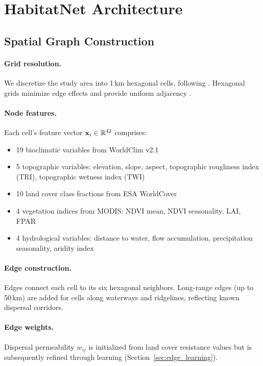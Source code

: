 \section{HabitatNet Architecture}

\label{sec:architecture}

\subsection{Spatial Graph Construction}

\paragraph{Grid resolution.} We discretize the study area into 1\,km
hexagonal cells, following \citet{jetz2019essential}. Hexagonal grids
minimize edge effects and provide uniform adjacency
\citep{birch2007rectangular}.

\paragraph{Node features.} Each cell's feature vector $\mathbf{x}_i \in
\mathbb{R}^{42}$ comprises:
\begin{itemize}
  \item 19 bioclimatic variables from WorldClim v2.1
    \citep{fick2017worldclim}
  \item 5 topographic variables: elevation, slope, aspect,
    topographic roughness index (TRI), topographic wetness index (TWI)
  \item 10 land cover class fractions from ESA WorldCover
    \citep{zanaga2022esa}
  \item 4 vegetation indices from MODIS: NDVI mean, NDVI seasonality,
    LAI, FPAR
  \item 4 hydrological variables: distance to water, flow accumulation,
    precipitation seasonality, aridity index
\end{itemize}

\paragraph{Edge construction.} Edges connect each cell to its six
hexagonal neighbors. Long-range edges (up to 50\,km) are added for cells
along waterways and ridgelines, reflecting known dispersal corridors.

\paragraph{Edge weights.} Dispersal permeability $w_{ij}$ is initialized
from land cover resistance values but is subsequently refined through
learning (Section~\ref{sec:edge_learning}).

